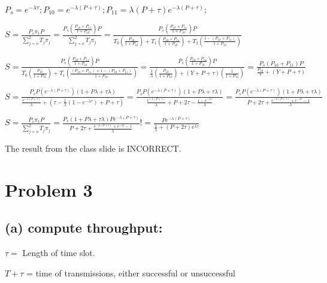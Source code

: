 \documentclass[12pt]{article}
\begin{document}
  $ P_s = e^{-\lambda\tau}; P_{10} = e^{-\lambda(P+\tau)};  P_{11} = \lambda(P+\tau)e^{-\lambda(P+\tau)};  $

  $S = \displaystyle\frac {P_s \pi_1 P} {\displaystyle  \sum_{j=o}^{2}  T_j \pi_j} = \displaystyle\frac {P_s  (\frac{P_{10}+P_{11}}{1+P_{10}}) P} {\displaystyle  \sum_{j=o}^{2}  T_j \pi_j} = \displaystyle\frac {P_s  (\frac{P_{10}+P_{11}}{1+P_{10}}) P} {T_0(\frac{P_{10}}{1+P_{10}}) + T_1(\frac{P_{10}+P_{11}}{1+P_{10}}) + T_2(\frac{1-(P_{10}+P_{11})}{1+P_{10}}) } $   
    
    $S = \displaystyle\frac {P_s  (\frac{P_{10}+P_{11}}{1+P_{10}}) P} {T_0(\frac {P_{10}} {1+P_{10}}) + T_1( \frac{(P_{10}+P_{11}) + 1-(P_{10}+P_{11})} {1+P_{10}}) } = \displaystyle\frac {P_s  (\frac{P_{10}+P_{11}}{1+P_{10}}) P} {\frac 1 \lambda(\frac {P_{10}} {1+P_{10}}) + (Y + P + \tau)( \frac{1} {1+P_{10}}) }  = \displaystyle\frac {P_s  ({P_{10}+P_{11}}) P}     {{ \frac {P_{10}} {\lambda} + (Y + P + \tau) }} $  

  $S = \displaystyle\frac {P_s  P(e^{-\lambda(P+\tau)})({1+P\lambda+ \tau\lambda})}     {{ \frac {e^{-\lambda(P+\tau)}} {\lambda} + ( \tau - \frac 1 \lambda (1-e^{-\lambda\tau}) + P + \tau) }} = \displaystyle\frac {P_s  P(e^{-\lambda(P+\tau)})({1+P\lambda+ \tau\lambda})}     {{ \frac {e^{-\lambda(P+\tau)}} {\lambda} + P +  2\tau - \frac {1-e^{-\lambda\tau}} \lambda }}  = \displaystyle\frac {P_s  P(e^{-\lambda(P+\tau)})({1+P\lambda+ \tau\lambda})}     {{ P +  2\tau + \frac {e^{-\lambda(P+\tau)} + e^{-\lambda\tau} - 1} \lambda }} $
  
  $S = \displaystyle\frac {P_s \pi_1 P} {\displaystyle  \sum_{j=o}^{2}  T_j \pi_j}  = \displaystyle\frac {P_s ({1+P\lambda+ \tau\lambda}) Pe^{-\lambda(P+\tau)} }     {{ P +  2\tau + \frac {e^{-\lambda(P+\tau)} + e^{-\lambda\tau} - 1} \lambda }} != \displaystyle\frac { P e^{-\lambda(P+\tau)} } { \frac 1 \lambda + (P+2\tau)e^{\lambda\tau}} $
  
  The result from the class slide is INCORRECT.

\pagebreak

 \section*{Problem 3 }   
 \subsection*{(a) compute throughput:} 
 $\tau = $ Length of time slot.

 $T+\tau$ = time of transmissions, either successful or unsuccessful
 
\end{document}
